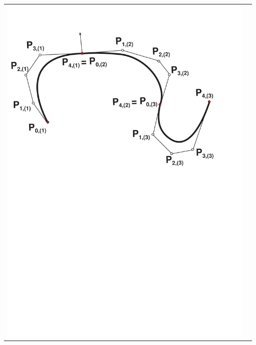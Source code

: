 \documentclass[ebook,oneside]{memoir}
\begin{document}
\begin{center}
\begin{tabular}{cc}
\includegraphics[scale=0.45]{3_21a.pdf} &

\end{tabular}
\end{center}
\end{document}
